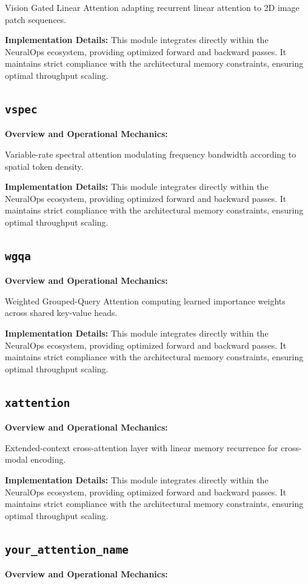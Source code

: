 \documentclass[10pt,twocolumn,letterpaper]{article}
\begin{document}
Vision Gated Linear Attention adapting recurrent linear attention to 2D image patch sequences.

\textbf{Implementation Details:}
This module integrates directly within the NeuralOps ecosystem, providing optimized forward and backward passes. It maintains strict compliance with the architectural memory constraints, ensuring optimal throughput scaling.

\subsection{\texttt{vspec}}
\textbf{Overview and Operational Mechanics:}

Variable-rate spectral attention modulating frequency bandwidth according to spatial token density.

\textbf{Implementation Details:}
This module integrates directly within the NeuralOps ecosystem, providing optimized forward and backward passes. It maintains strict compliance with the architectural memory constraints, ensuring optimal throughput scaling.

\subsection{\texttt{wgqa}}
\textbf{Overview and Operational Mechanics:}

Weighted Grouped-Query Attention computing learned importance weights across shared key-value heads.

\textbf{Implementation Details:}
This module integrates directly within the NeuralOps ecosystem, providing optimized forward and backward passes. It maintains strict compliance with the architectural memory constraints, ensuring optimal throughput scaling.

\subsection{\texttt{xattention}}
\textbf{Overview and Operational Mechanics:}

Extended-context cross-attention layer with linear memory recurrence for cross-modal encoding.

\textbf{Implementation Details:}
This module integrates directly within the NeuralOps ecosystem, providing optimized forward and backward passes. It maintains strict compliance with the architectural memory constraints, ensuring optimal throughput scaling.

\subsection{\texttt{your\_attention\_name}}
\textbf{Overview and Operational Mechanics:}
\end{document}
